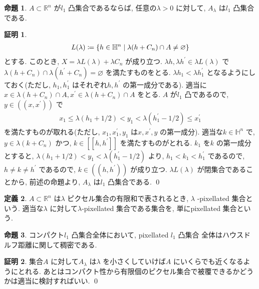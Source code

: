 \documentclass[10pt, fleqn, label-section=none]{bxjsarticle}
\theoremstyle{definition}
\newtheorem{dfn}{定義}[section]
\newtheorem{prop}[dfn]{命題}
\newtheorem*{pf*}{証明}
\newcommand{\cbra}[1]{\mleft\{#1\mright\}}
\renewcommand{\;}{\, ; \,}
\begin{document}
\begin{prop}$A \subset \mathbb R^n$ が$l_1$ 凸集合であるならば, 任意の$\lambda > 0$ に対して, $A_\lambda $ は$l_1$ 凸集合である.  

\end{prop}
\begin{pf*}
\begin{align*} L(\lambda) \coloneqq \cbra{h \in \mathbb H^n \mid \lambda (h + C_n) \cap A \neq \varnothing} \end{align*}
とする. このとき, $X = \lambda L(\lambda) + \lambda C_n$ が成り立つ. $\lambda h, \lambda h^\prime \in  \lambda L(\lambda)$ で$\lambda(h + C_n) \cap \lambda(h^\prime + C_n) = \varnothing$ を満たすものをとる. $\lambda h_1 < \lambda h^\prime_1$ となるようにしておく(ただし, $h_1, h^\prime_1$ はそれぞれ$h, h^\prime$ の第一成分である). 適当に$x \in \lambda(h + C_n) \cap A, x^\prime \in \lambda(h + C_n) \cap A$ をとる. $A$ が$l_1$ 凸であるので, $y \in ((x, x^\prime))$ で
\begin{align*} x_1 \leq \lambda (h_1 + 1/2) < y_1 <  \lambda (h^\prime_1 - 1/2) \leq x^\prime_1  \end{align*}
を満たすものが取れる(ただし, $x_1, x^\prime_1, y_1$ は$x, x^\prime, y$ の第一成分). 適当な$k \in \mathbb H^n$ で, $y \in \lambda(k +  C_n) $ かつ, $k \in [[h, h^\prime]]$ を満たすものがとれる. $k_1$ を$k$ の第一成分とすると, $\lambda (h_1 + 1/2) < y_1 <  \lambda (h^\prime_1 - 1/2)$ より, $h_1 < k_1 < h^\prime_1$ であるので, $h \neq k \neq h^\prime $ であるので, $k \in ((h, h^\prime))$ が成り立つ. $\lambda L(\lambda)$ が閉集合であることから, 前述の命題より, $A_\lambda $ は$l_1$ 凸集合である.
\qed
\end{pf*}

\begin{dfn}$A \subset \mathbb R^n$ は$\lambda$ ピクセル集合の有限和で表されるとき, $\lambda$ -pixellated 集合という. 適当な$\lambda$ に対して$\lambda$-pixellated 集合である集合を, 単にpixellated 集合という. 

\end{dfn}

\begin{prop}コンパクト$l_1$ 凸集合全体において, pixellated $l_1$ 凸集合 全体はハウスドルフ距離に関して稠密である. 

\end{prop}
\begin{pf*}集合$A$ に対して$A_\lambda$ は$\lambda$ を小さくしていけば$A$ にいくらでも近くなるようにとれる. あとはコンパクト性から有限個のピクセル集合で被覆できるかどうかは適当に検討すればいい. 
\qed
\end{pf*}
\end{document}
